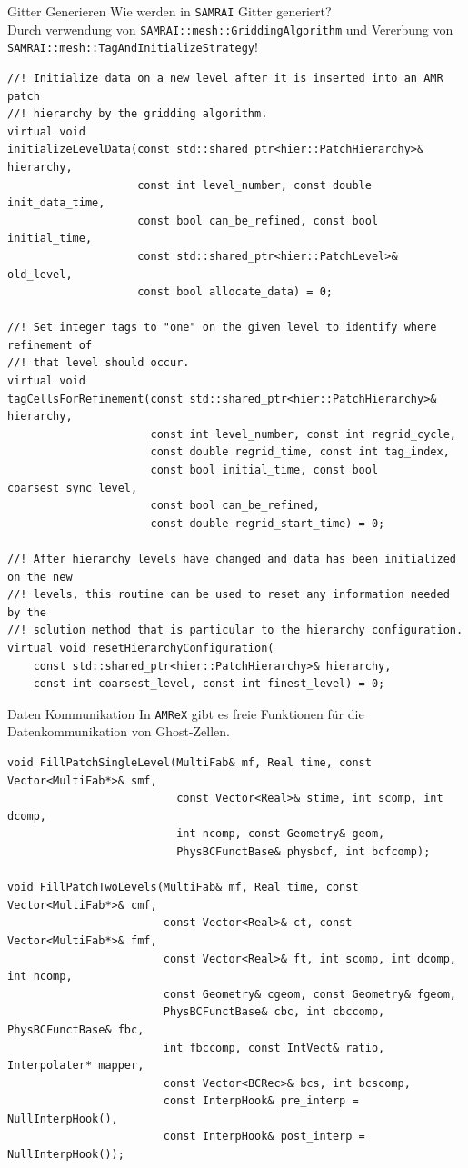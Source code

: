 \documentclass[ucs,9pt]{beamer}
\begin{document}
\begin{frame}[fragile]{Gitter Generieren}
Wie werden in \texttt{SAMRAI} Gitter generiert?\pause\\
Durch verwendung von \texttt{SAMRAI::mesh::GriddingAlgorithm} und Vererbung von \texttt{SAMRAI::mesh::TagAndInitializeStrategy}!
\pause
\begin{lstlisting}
//! Initialize data on a new level after it is inserted into an AMR patch
//! hierarchy by the gridding algorithm.
virtual void
initializeLevelData(const std::shared_ptr<hier::PatchHierarchy>& hierarchy,
                    const int level_number, const double init_data_time,
                    const bool can_be_refined, const bool initial_time,
                    const std::shared_ptr<hier::PatchLevel>& old_level,
                    const bool allocate_data) = 0;

//! Set integer tags to "one" on the given level to identify where refinement of
//! that level should occur.
virtual void
tagCellsForRefinement(const std::shared_ptr<hier::PatchHierarchy>& hierarchy,
                      const int level_number, const int regrid_cycle,
                      const double regrid_time, const int tag_index,
                      const bool initial_time, const bool coarsest_sync_level,
                      const bool can_be_refined,
                      const double regrid_start_time) = 0;

//! After hierarchy levels have changed and data has been initialized on the new
//! levels, this routine can be used to reset any information needed by the
//! solution method that is particular to the hierarchy configuration.
virtual void resetHierarchyConfiguration(
    const std::shared_ptr<hier::PatchHierarchy>& hierarchy,
    const int coarsest_level, const int finest_level) = 0;
\end{lstlisting}
\end{frame}

\begin{frame}[fragile]{Daten Kommunikation}
In \texttt{AMReX} gibt es freie Funktionen für die Datenkommunikation von Ghost-Zellen.
\begin{lstlisting}
void FillPatchSingleLevel(MultiFab& mf, Real time, const Vector<MultiFab*>& smf,
                          const Vector<Real>& stime, int scomp, int dcomp,
                          int ncomp, const Geometry& geom,
                          PhysBCFunctBase& physbcf, int bcfcomp);

void FillPatchTwoLevels(MultiFab& mf, Real time, const Vector<MultiFab*>& cmf,
                        const Vector<Real>& ct, const Vector<MultiFab*>& fmf,
                        const Vector<Real>& ft, int scomp, int dcomp, int ncomp,
                        const Geometry& cgeom, const Geometry& fgeom,
                        PhysBCFunctBase& cbc, int cbccomp, PhysBCFunctBase& fbc,
                        int fbccomp, const IntVect& ratio, Interpolater* mapper,
                        const Vector<BCRec>& bcs, int bcscomp,
                        const InterpHook& pre_interp = NullInterpHook(),
                        const InterpHook& post_interp = NullInterpHook());
\end{lstlisting}
\end{frame}
\end{document}
